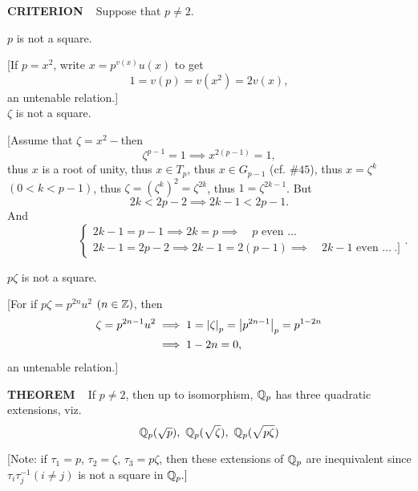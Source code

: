 \begin{x}{\small\bf CRITERION} \ %
Suppose that $p \ne 2$.

\vspace{0.1cm}

\indent\indent \textbullet \quad $p$ is not a square.

[If $p = x^2$, write $x = p^{v(x)}u(x)$ to get 
\[
1 = v(p) = v(x^2) = 2v(x),
\] 
an untenable relation.]\\

\indent\indent \textbullet \quad $\zeta$ is not a square.

[Assume that $\zeta = x^2 -$then
\[
\zeta^{p-1} = 1 \implies x^{2(p-1)} = 1,
\]
thus $x$ is a root of unity, thus $x\in T_p$, 
thus $x \in G_{p-1}$ (cf. $\# 45$), 
thus $x = \zeta^k$ $(0 < k < p-1)$, 
thus $\zeta = (\zeta^k)^2 = \zeta^{2k}$, thus $1 = \zeta^{2k-1}$.  
But
\[
2k < 2p - 2 \implies 2k-1 < 2p -1.
\]
And
\[
\qquad \qquad\qquad
\begin{cases}
2k - 1 = p -1 \implies 2k = p \implies \quad \text{$p$ even $\dots$} \\
2k - 1 = 2p -2 \implies 2k - 1 = 2(p-1) \implies   \quad \text{$2k - 1$ even $\dots \  .]$}
\end{cases}
.\]

\vspace{0.1cm}

\indent\indent \textbullet \quad $p\zeta$ is not a square.

\vspace{0.1cm}

[For if $p\zeta = p^{2n}u^2$ $(n \in \mathbb{Z})$, then
\[
\begin{aligned}
\zeta = p^{2n-1}u^2 
&\implies 1 = \left\vert\zeta\right\vert_p = \left\vert p^{2n-1}\right\vert_p = p^{1 - 2n} \\
&\implies 1 - 2n = 0,
\end{aligned}
\]
an untenable relation.]
\end{x}
\vspace{0.1cm}

\begin{x}{\small\bf THEOREM} \ %
If $p \ne 2$, then up to isomorphism, $\mathbb{Q}_p$ has three quadratic extensions, viz.
\[
\mathbb{Q}_p(\sqrt{p}), \  \mathbb{Q}_p(\sqrt{\zeta}), \  \mathbb{Q}_p(\sqrt{p\zeta})
\]

[Note: if $\tau_1 = p$, $\tau_2 = \zeta$, $\tau_3 = p\zeta$, then these extensions of $\mathbb{Q}_p$ are inequivalent 
since $\tau_i\tau_j^{-1} (i \ne j)$ is not a square in $\mathbb{Q}_p.]$
\end{x}
\vspace{0.1cm}

